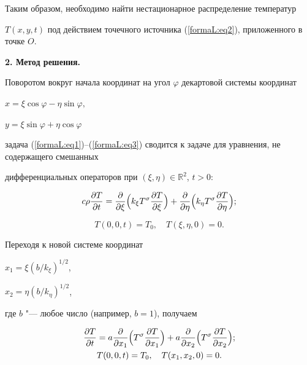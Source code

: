Таким образом, необходимо найти нестационарное распределение температур 

$T(x,y,t)$ под действием точечного источника (\ref{formaL:eq2}), приложенного в точке $O$.



\smallskip

\textbf{2. Метод решения.} 

Поворотом вокруг начала координат на угол $\varphi $ декартовой системы координат

$

x=\xi \cos \varphi -\eta \sin \varphi, $

$y=\xi \sin \varphi +\eta \cos \varphi $

задача (\ref{formaL:eq1})--(\ref{formaL:eq3}) сводится к задаче для уравнения, не содержащего смешанных 

дифференциальных операторов при $(\xi, \eta) \in \mathbb R^2$, $t>0$:

\[

c\rho \frac{\partial T}{\partial t}=

\frac{\partial }{\partial \xi }\Bigl(k_\xi T^\sigma \frac{\partial 

T}{\partial \xi }\Bigr)+\frac{\partial }{\partial \eta }\Bigl(k_\eta 

T^\sigma \frac{\partial T}{\partial \eta }\Bigr);

\]

\[

T(0,0,t)=T_0 ,

\quad

T(\xi ,\eta ,0)=0.

\]

Переходя к новой системе координат

$x_1 = \xi ({b}/{k_\xi })^{1/2}$,

$

x_2 = \eta ({b}/{k_\eta })^{1/2}$,

где $b$ "--- любое число (например, $b=1$), получаем

\begin{gather}

\label{formaL:eq:7}

\frac{\partial T}{\partial t}= a\frac{\partial }{\partial x_1 }\Bigl(T^\sigma \frac{\partial T}{\partial x_1 }\Bigr)+

a\frac{\partial }{\partial x_2 }\Bigl(T^\sigma \frac{\partial T}{\partial x_2 }\Bigr);

\\

\label{formaL:eq4}

T(0, 0, t)=T_0 ,

\quad

T(x_1, x_2 , 0)=0.

\end{gather}



